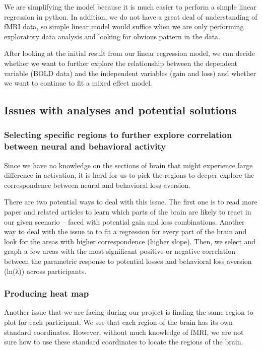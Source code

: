 \documentclass[11pt]{article}
\begin{document}
We are simplifying the model because it is much easier to perform a simple linear regression in python. In addition, we do not have a great deal of understanding of fMRI data, so simple linear model would suffice when we are only performing exploratory data analysis and looking for obvious pattern in the data.

After looking at the initial result from our linear regression model, we can decide whether we want to further explore the relationship between the dependent variable (BOLD data) and the independent variables (gain and loss) and whether we want to continue to fit a mixed effect model.


\subsection{Issues with analyses and potential solutions}
\subsubsection{Selecting specific regions to further explore correlation between neural and behavioral activity}
\indent \indent Since we have no knowledge on the sections of brain that might experience large difference in activation, it is hard for us to pick the regions to deeper explore the correspondence between neural and behavioral loss aversion.

There are two potential ways to deal with this issue. The first one is to read more paper and related articles to learn which parts of the brain are likely to react in our given scenario -- faced with potential gain and loss combinations. Another way to deal with the issue to to fit a regression for every part of the brain and look for the areas with higher correspondence (higher slope). Then, we select and graph a few areas with the most significant positive or negative correlation between the parametric response to potential losses and behavioral loss aversion (ln(λ)) across participants.


\subsubsection{Producing heat map}
\indent \indent Another issue that we are facing during our project is finding the same region to plot for each participant. We see that each region of the brain has its own standard coordinates. However, without much knowledge of fMRI, we are not sure how to use these standard coordinates to locate the regions of the brain.
\end{document}
